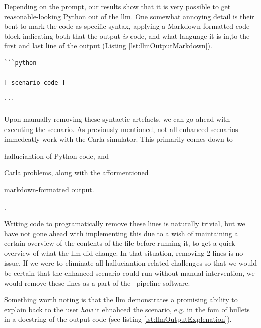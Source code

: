 Depending on the prompt, our results show that it is very possible to get
reasonable-looking Python out of the \acrshort{llm}. One somewhat annoying
detail is their bent to mark the code as specific syntax, applying a Markdown-formatted code block
indicating both that the output \emph{is} code, and what language it is in,to the first and last
line of the output (Listing \ref{lst:llmOutputMarkdown}).
\begin{lstlisting}[caption={\acrshort{llm}-generated Python code with Markdown syntax. The bracketed part on line 3 has been added for demonstration purposes, removing the actual code for brevity.}, label={lst:llmOutputMarkdown}]
```python

[ scenario code ]

```
\end{lstlisting}

Upon manually removing these syntactic artefacts, we can go ahead with executing
the scenario. As previously mentioned, not all enhanced scenarios immedeatly work with the Carla
simulator. This primarily comes down to \begin{inparaenum}
    \item halluciantion of Python code, and
    \item Carla problems, along with the afformentioned
    \item markdown-formatted output.
\end{inparaenum}.

Writing code to programatically remove these lines is naturally trivial, but we have
not gone ahead with implementing this due to a wish of maintaining a certain overview of the
contents of the file before running it, to get a quick overview of what the \acrshort{llm} did
change. In that situation, removing \num{2} lines is no issue. If we were to eliminate all
halluciantion-related challenges so that we would be certain that the enhanced scenario could run
without manual intervention, we would remove these lines as a part of the \hefe~pipeline software.

Something worth noting is that the \acrshort{llm} demonstrates a promising
ability to explain back to the user \emph{how} it ehnahced the scenario, e.g. in
the fom of bullets in a docstring of the output code (see listing \ref{lst:llmOutputExplenation}).

